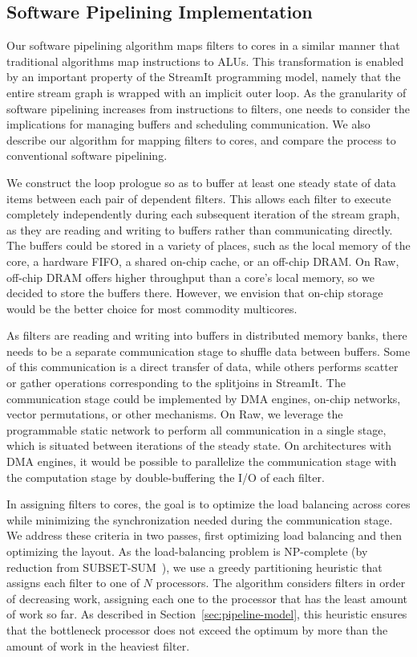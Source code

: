 \subsection{Software Pipelining Implementation}

Our software pipelining algorithm maps filters to cores in a similar
manner that traditional algorithms map instructions to ALUs.  This
transformation is enabled by an important property of the StreamIt
programming model, namely that the entire stream graph is wrapped with
an implicit outer loop.  As the granularity of software pipelining
increases from instructions to filters, one needs to consider the
implications for managing buffers and scheduling communication.  We
also describe our algorithm for mapping filters to cores, and compare
the process to conventional software pipelining.

We construct the loop prologue so as to buffer at least one steady state
of data items between each pair of dependent filters.  This allows
each filter to execute completely independently during each subsequent
iteration of the stream graph, as they are reading and writing to
buffers rather than communicating directly.  The buffers could be
stored in a variety of places, such as the local memory of the core, a
hardware FIFO, a shared on-chip cache, or an off-chip DRAM.  On Raw,
off-chip DRAM offers higher throughput than a core's local memory, so
we decided to store the buffers there.  However, we envision that
on-chip storage would be the better choice for most commodity
multicores.

As filters are reading and writing into buffers in distributed memory
banks, there needs to be a separate communication stage to shuffle
data between buffers.  Some of this communication is a direct transfer
of data, while others performs scatter or gather operations
corresponding to the splitjoins in StreamIt.  The communication stage
could be implemented by DMA engines, on-chip networks, vector
permutations, or other mechanisms.  On Raw, we leverage the
programmable static network to perform all communication in a single
stage, which is situated between iterations of the steady state.  On
architectures with DMA engines, it would be possible to parallelize
the communication stage with the computation stage by double-buffering
the I/O of each filter.

In assigning filters to cores, the goal is to optimize the load
balancing across cores while minimizing the synchronization needed
during the communication stage.  We address these criteria in two
passes, first optimizing load balancing and then optimizing the
layout.  As the load-balancing problem is NP-complete (by reduction
from SUBSET-SUM~\cite{sipser97}), we use a greedy partitioning
heuristic that assigns each filter to one of $N$ processors.  The
algorithm considers filters in order of decreasing work, assigning
each one to the processor that has the least amount of work so far.
As described in Section~\ref{sec:pipeline-model}, this heuristic
ensures that the bottleneck processor does not exceed the optimum by
more than the amount of work in the heaviest filter.


